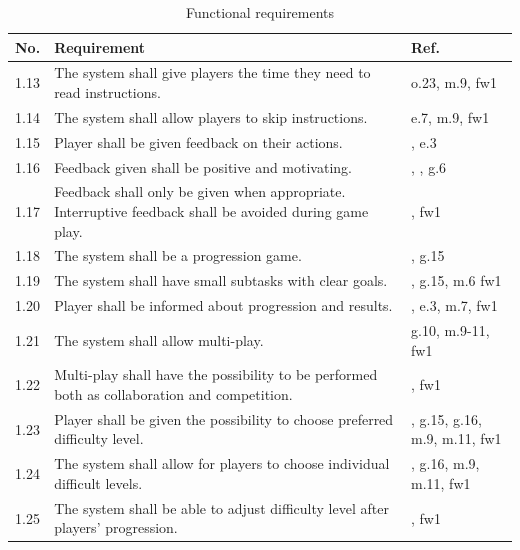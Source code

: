 \begin{table} [H]
\centering
\begin{tabular}{|>{\raggedright}p{}|p{}|p{}|}
\hline
\textbf{No.} & \textbf{Requirement} & \textbf{Ref.} \\ \hline
1.13 & The system shall give players the time they need to read instructions. & o.23, m.9, fw1 \\ \hline 
1.14 & The system shall allow players to skip instructions. & \cite{sweetser} e.7, m.9, fw1 \\ \hline 
1.15 & Player shall be given feedback on their actions. &  \cite{sweetser}, e.3 \\ \hline
1.16 & Feedback given shall be positive and motivating. &  \cite{sweetser}, \cite{project}, g.6 \\ \hline
1.17 & Feedback shall only be given when appropriate. Interruptive feedback shall be avoided during game play. &  \cite{sweetser}, fw1 \\ \hline
1.18 & The system shall be a progression game. & \cite{understandingvg} \cite{sweetser}, g.15 \\ \hline
1.19 & The system shall have small subtasks with clear goals. &  \cite{sweetser} \cite{john2012smartsenior}, g.15, m.6 fw1\\ \hline
1.20 & Player shall be informed about progression and results. & \cite{sweetser} \cite{john2012smartsenior}, e.3, m.7, fw1 \\ \hline
1.21 & The system shall allow multi-play. & g.10, m.9-11, fw1 \\ \hline
1.22 & Multi-play shall have the possibility to be performed both as collaboration and competition. & \cite{sweetser}, fw1\\ \hline
1.23 & Player shall be given the possibility to choose preferred difficulty level. & \cite{sweetser}, g.15, g.16, m.9, m.11, fw1\\ \hline
1.24 & The system shall allow for players to choose individual difficult levels. & \cite{sweetser}, g.16, m.9, m.11, fw1\\ \hline
1.25 & The system shall be able to adjust difficulty level after players' progression. & \cite{sweetser}, fw1 \\ \hline
    \end{tabular}
    \caption[Functional requirements, part 2]{Functional requirements}
    \label{tab:func2}
\end{table} 


